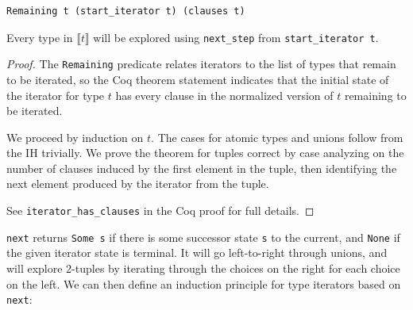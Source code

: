 \documentclass[a4paper,english]{lipics-v2019}
\newcommand{\denotes}[1]{\llbracket #1 \rrbracket}
\begin{document}
\begin{theorem}\begin{verbatim}
Remaining t (start_iterator t) (clauses t)
\end{verbatim}
Every type in $\denotes{t}$ will be explored using \verb|next_step| from \verb|start_iterator t|. 
\end{theorem}
\begin{proof}
The \verb|Remaining| predicate relates iterators to the list of types that remain to be iterated, so
the Coq theorem statement indicates that the initial state of the iterator for type $t$ has every clause
in the normalized version of $t$ remaining to be iterated.

We proceed by induction on $t$. The cases for atomic types and unions follow
from the IH trivially. We prove the theorem for tuples correct by case analyzing
on the number of clauses induced by the first element in the tuple, then identifying
the next element produced by the iterator from the tuple.

See \verb|iterator_has_clauses| in the Coq proof for full details.
\end{proof}

\verb|next| returns \verb|Some s| if there is some successor state
\verb|s| to the current, and \verb|None| if the given iterator state is
terminal. It will go left-to-right through unions, and will explore 2-tuples
by iterating through the choices on the right for each choice on the left. We can
then define an induction principle for type iterators based on \verb|next|:
\end{document}
